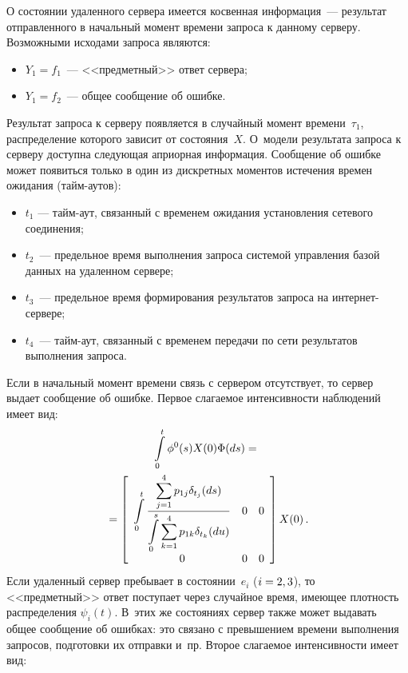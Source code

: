 \begin{multicols}{2}
 О состоянии удаленного сервера имеется косвенная информация~---
 результат отправленного в начальный момент времени запроса к данному
 серверу. Возможными исходами запроса являются:
  \begin{itemize}
 \item
 $Y_1=f_1$~--- <<предметный>> ответ сервера;
 \item
 $Y_1=f_2$~--- общее сообщение об ошибке.
 \end{itemize}
 Результат запроса к серверу появляется в случайный момент времени~$\tau_1$,
 распределение которого зависит от состояния~$X$. О~модели результата запроса
 к серверу доступна следующая априорная информация. Сообщение об ошибке может
 появиться только в один из дискретных моментов истечения времен ожидания
 (тайм-аутов):
 \begin{itemize}
 \item
 $t_1$ --- тайм-аут, связанный с временем ожидания установления сетевого
 соединения;
 \item
 $t_2$~--- предельное время выполнения запроса сис\-те\-мой
 управления базой данных на удаленном сервере;
 \item
 $t_3$~--- предельное время формирования результатов запроса на ин\-тер\-нет-сер\-ве\-ре;
 \item
 $t_4$~--- тайм-аут, связанный с временем передачи по сети результатов
 выполнения запроса.
 \end{itemize}
 Если в начальный момент времени связь с сервером отсутствует, то сервер выдает
 сообщение об ошибке. Первое слагаемое интенсивности наблюдений имеет вид:
 \begin{multline*}
 \int\limits_0^t \phi^0(s)X(0)\Phi(ds)={}\\
 {}=
  \displaystyle  \left[
  \begin{array}{ccc}
  \displaystyle \int\limits_0^t\displaystyle\frac{\displaystyle \displaystyle \sum\limits_{j=1}^{4}p_{1j}\delta_{t_j}(ds)\mathstrut}{\displaystyle \displaystyle \int\limits_0^s \sum\limits_{k=1}^{4}p_{1k}\delta_{t_k}(du)\mathstrut} &
  0 & 0\\[9pt]
  0 & 0 & 0
  \end{array}
  \right]
  X(0)\,.
 \end{multline*}
 Если удаленный сервер пребывает в состоянии~$e_i$ ($i\hm=2,3$),
 то <<предметный>> ответ поступает через случайное время, имеющее
 плот\-ность распределения $\psi_i(t)$. В~этих же состояниях сервер
 также может выдавать общее сообщение об ошибках: это связано с превышением
 времени выполнения запросов, подготовки их отправки и~пр.
 Второе слагаемое интенсивности имеет вид:

\end{multicols}
